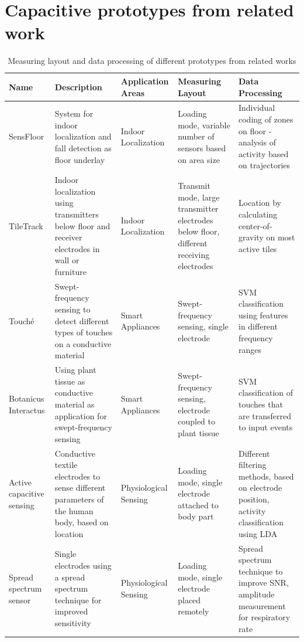 \section{Capacitive prototypes from related work}
\begin{table}[htbp]	
	\centering
  \footnotesize
  \caption{Measuring layout and data processing of different prototypes from related works}
    \begin{tabularx}{\linewidth}{Xp{3.5cm}Xp{3.5cm}p{3.5cm}}
    \toprule
    \textbf{Name} & \textbf{Description} & \textbf{Application Areas} & \textbf{Measuring Layout} & \textbf{Data Processing} \\
    \midrule
    SensFloor \cite{lauterbach2009} & System for indoor localization and fall detection as floor underlay & Indoor Localization & Loading mode, variable number of sensors based on area size & Individual coding of zones on floor - analysis of activity based on trajectories \\
    TileTrack \cite{Valtonen2009a} & Indoor localization using transmitters below floor and receiver electrodes in wall or furniture & Indoor Localization & Transmit mode, large transmitter electrodes below floor, different receiving electrodes & Location by calculating center-of-gravity on most active tiles \\
    Touché \cite{Sato2012} & Swept-frequency sensing to detect different types of touches on a conductive material & Smart Appliances & Swept-frequency sensing, single electrode & SVM classification using features in different frequency ranges \\
    Botanicus Interactus \cite{poupyrev2012botanicus} & Using plant tissue as conductive material as application for swept-frequency sensing & Smart Appliances & Swept-frequency sensing, electrode coupled to plant tissue & SVM classification of touches that are transferred to input events \\
    Active capacitive sensing \cite{cheng2010active} & Conductive textile electrodes to sense different parameters of the human body, based on location & Physiological Sensing & Loading mode, single electrode attached to body part & Different filtering methods, based on electrode position, activity classification using LDA \\
    Spread spectrum sensor \cite{MacLachlan2004} & Single electrodes using a spread spectrum technique for improved sensitivity & Physiological Sensing & Loading mode, single electrode placed remotely & Spread spectrum technique to improve SNR, amplitude measurement for respiratory rate \\

\end{tabularx}
\end{table}
